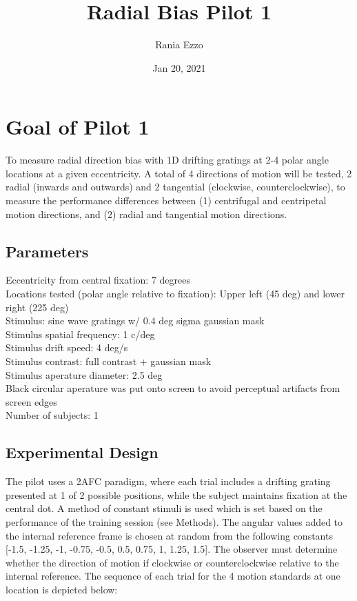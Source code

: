 \documentclass[11pt]{article} %
\title{Radial Bias Pilot 1}
\date{Jan 20, 2021}
\author{Rania Ezzo}
\begin{document}
\maketitle
\tableofcontents


\section{Goal of Pilot 1}
To measure radial direction bias with 1D drifting gratings at 2-4 polar angle locations at a given eccentricity. A total of 4 directions of motion will be tested, 2 radial (inwards and outwards) and 2 tangential (clockwise, counterclockwise), to measure the performance differences between (1) centrifugal and centripetal motion directions, and (2) radial and tangential motion directions. 

\subsection{Parameters}
Eccentricity from central fixation: 7 degrees
\\
Locations tested (polar angle relative to fixation): Upper left (45 deg) and lower right (225 deg)
\\
Stimulus: sine wave gratings w/ 0.4 deg sigma gaussian mask
\\
Stimulus spatial frequency: 1 c/deg
\\
Stimulus drift speed: 4 deg/s
\\
Stimulus contrast: full contrast + gaussian mask
\\
Stimulus aperature diameter: 2.5 deg
\\
Black circular aperature was put onto screen to avoid perceptual artifacts from screen edges
\\
Number of subjects: 1

\subsection{Experimental Design}
The pilot uses a 2AFC paradigm, where each trial includes a drifting grating presented at 1 of 2 possible positions, while the subject maintains fixation at the central dot. A method of constant stimuli is used which is set based on the performance of the training session (see Methods). The angular values added to the internal reference frame is chosen at random from the following constants [-1.5, -1.25, -1, -0.75, -0.5, 0.5, 0.75, 1, 1.25, 1.5]. The observer must determine whether the direction of motion if clockwise or counterclockwise relative to the internal reference. The sequence of each trial for the 4 motion standards at one location is depicted below:
\end{document}
